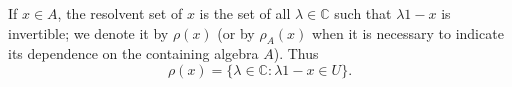 If $x \in A$, the resolvent set of $x$ is the set of all $\lambda \in \mathbb{C}$ such that $\lambda 1 - x$ is invertible; we denote it by $\rho(x)$ (or by $\rho_A(x)$ when it is necessary to indicate its dependence on the containing algebra $A$). Thus
$$\rho(x) = \{\lambda \in \mathbb{C} : \lambda 1 - x \in U\}.$$
